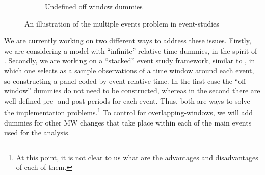 \begin{figure}[t!]
\begin{subfigure}{1\textwidth}
            \caption{Undefined off window dummies}
        \end{subfigure}
        \caption{An illustration of the multiple events problem in event-studies}
        \label{fig:multiple-events-example}
    \end{figure}
    
    We are currently working on two different ways to address these issues. Firstly, we are considering a model with ``infinite'' relative time dummies, in the spirit of \textcite[][, equation 1]{borusyak2017revisiting}. Secondly, we are working on a ``stacked'' event study framework, similar to \textcite{cengiz2019effect}, in which one selects as a sample observations of a time window around each event, so constructing a panel coded by event-relative time. In the first case the ``off window'' dummies do not need to be constructed, whereas in the second there are well-defined pre- and post-periods for each event. Thus, both are ways to solve the implementation problems.\footnote{At this point, it is not clear to us what are the advantages and disadvantages of each of them.} To control for overlapping-windows, we will add dummies for other MW changes that take place within each of the main events used for the analysis.
    

